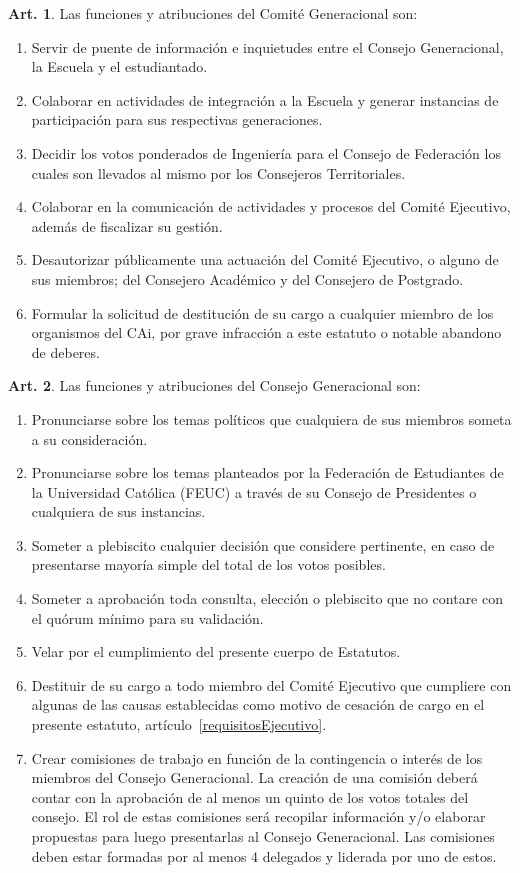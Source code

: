 \documentclass[letterpaper,11pt]{article}
\theoremstyle{definition}%
\newtheorem{art}{Art.} %
\begin{document}
\begin{art}\label{funcionesComiteGeneracional}
	Las funciones y atribuciones del Comité Generacional son:
	\begin{enumerate}
		\item Servir de puente de información e inquietudes entre el Consejo Generacional, la Escuela y el estudiantado.
		\item Colaborar en actividades de integración a la Escuela y generar instancias de participación para sus respectivas generaciones.
		\item Decidir los votos ponderados de Ingeniería para el Consejo de Federación los cuales son llevados al mismo por los Consejeros Territoriales.
		\item Colaborar en la comunicación de actividades y procesos del Comité Ejecutivo, además de fiscalizar su gestión.
		\item Desautorizar públicamente una actuación del Comité Ejecutivo, o alguno de sus miembros; del Consejero Académico y del Consejero de Postgrado.
		\item Formular la solicitud de destitución de su cargo a cualquier miembro de los organismos del CAi, por grave infracción a este estatuto o notable abandono de deberes.
	\end{enumerate}
\end{art}

\begin{art}\label{funcionesConsejoGeneracional}
	Las funciones y atribuciones del Consejo Generacional son:
	\begin{enumerate}
		\item Pronunciarse sobre los temas políticos que cualquiera de sus miembros someta a su consideración.
		\item Pronunciarse sobre los temas planteados por la Federación de Estudiantes de la Universidad Católica (FEUC) a través de su Consejo de Presidentes o cualquiera de sus instancias.
		\item Someter a plebiscito cualquier decisión que considere pertinente, en caso de presentarse mayoría simple del total de los votos posibles.
		\item Someter a aprobación toda consulta, elección o plebiscito que no contare con el quórum mínimo para su validación.
		\item Velar por el cumplimiento del presente cuerpo de Estatutos.
		\item Destituir de su cargo a todo miembro del Comité Ejecutivo que cumpliere con algunas de las causas establecidas como motivo de cesación de cargo en el presente estatuto, artículo~\ref{requisitosEjecutivo}.
		\item  Crear comisiones de trabajo en función de la contingencia o interés de los miembros del Consejo Generacional. La creación de una comisión deberá contar con la aprobación de al menos un quinto de los votos totales del consejo. El rol de estas comisiones será recopilar información y/o elaborar propuestas para luego presentarlas al Consejo Generacional. Las comisiones deben estar formadas por al menos 4 delegados y liderada por uno de estos.
	\end{enumerate}
\end{art}
\end{document}
